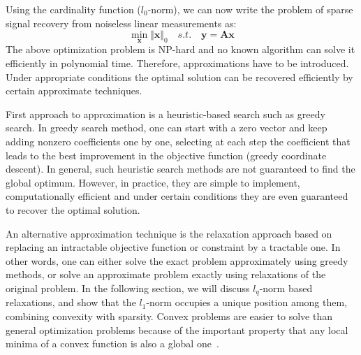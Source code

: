 \documentclass[journal]{IEEEtran}
\begin{document}

Using the cardinality function ($l_0$-norm), we can now write the problem of sparse signal recovery from noiseless linear measurements as:
%
\begin{equation}
	\min_{\boldsymbol{x}}\Vert \boldsymbol{x}\Vert_0 \quad s.t. \quad \boldsymbol{y}=\boldsymbol{A} \boldsymbol{x}
\end{equation}
%
The above optimization problem is NP-hard and no known algorithm can solve it efficiently in polynomial time. Therefore, approximations have to be introduced. Under appropriate conditions the optimal solution can be recovered efficiently by certain approximate techniques.

First approach to approximation is a heuristic-based search such as greedy search. In greedy search method, one can start with a zero vector and keep adding nonzero coefficients one by one, selecting at each step the coefficient that leads to the best improvement in the objective function (greedy coordinate descent). In general, such heuristic search methods are not guaranteed to find the global optimum. However, in practice, they are simple to implement, computationally efficient and under certain conditions they are even guaranteed to recover the optimal solution.

An alternative approximation technique is the relaxation approach based on replacing an intractable objective function or constraint by a tractable one. In other words, one can either solve the exact problem approximately using greedy methods, or solve an approximate problem exactly using relaxations of the original problem. In the following section, we will discuss $l_q$-norm based relaxations, and show that the $l_1$-norm occupies a unique position among them, combining convexity with sparsity. Convex problems are easier to solve than general optimization problems because of the important property that any local minima of a convex function is also a global one~\cite{Rish2015}.
\end{document}
